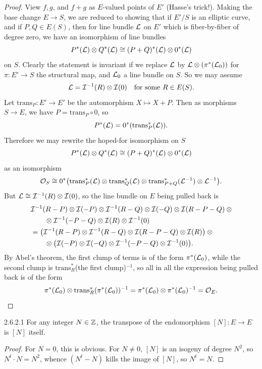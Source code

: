 \begin{proof}
View $f, g$, and $f + g$ as $E$-valued points of $E'$ (Hasse's trick!). Making the base change $E \to S$, we are reduced to showing that if $E'/S$ is an elliptic curve, and if $P, Q \in E(S)$, then for line bundle $\mathcal{L}$ on $E'$ which is fiber-by-fiber of degree zero, we have an isomorphism of line bundles
\[
P^*(\mathcal{L}) \otimes Q^*(\mathcal{L}) \cong (P + Q)^*(\mathcal{L}) \otimes 0^*(\mathcal{L})
\]
on $S$. Clearly the statement is invariant if we replace $\mathcal{L}$ by $\mathcal{L} \otimes (\pi^*(\mathcal{L}_0))$ for $\pi : E' \to S$ the structural map, and $\mathcal{L}_0$ a line bundle on $S$. So we may assume
\[
\mathcal{L} = \mathcal{I}^{-1}(R) \otimes \mathcal{I}(0) \quad \text{for some } R \in E(S).
\]
Let $\mathrm{trans}_P : E' \to E'$ be the automorphism $X \mapsto X + P$. Then as morphisms $S \to E$, we have $P = \mathrm{trans}_P \circ 0$, so
\[
P^*(\mathcal{L}) = 0^*(\mathrm{trans}_P^*(\mathcal{L})).
\]
Therefore we may rewrite the hoped-for isomorphism on $S$
\[
P^*(\mathcal{L}) \otimes Q^*(\mathcal{L}) \cong (P + Q)^*(\mathcal{L}) \otimes 0^*(\mathcal{L})
\]
as an isomorphism
\[
\mathcal{O}_S \cong 0^*\bigl(\mathrm{trans}_P^*(\mathcal{L}) \otimes \mathrm{trans}_Q^*(\mathcal{L}) \otimes \mathrm{trans}_{P+Q}^*(\mathcal{L}^{-1}) \otimes \mathcal{L}^{-1}\bigr).
\]
But $\mathcal{L} \cong \mathcal{I}^{-1}(R) \otimes \mathcal{I}(0)$, so the line bundle on $E$ being pulled back is
\[
\begin{aligned}
&\mathcal{I}^{-1}(R-P) \otimes \mathcal{I}(-P) \otimes \mathcal{I}^{-1}(R-Q) \otimes \mathcal{I}(-Q) \otimes \mathcal{I}(R-P-Q) \otimes {}\mkern-4mu \\
&\qquad \otimes \mathcal{I}^{-1}(-P-Q) \otimes \mathcal{I}(R) \otimes \mathcal{I}^{-1}(0) \\
&= \bigl(\mathcal{I}^{-1}(R-P) \otimes \mathcal{I}^{-1}(R-Q) \otimes \mathcal{I}(R-P-Q) \otimes \mathcal{I}(R)\bigr) \otimes {} \\
&\qquad \otimes \bigl(\mathcal{I}(-P) \otimes \mathcal{I}(-Q) \otimes \mathcal{I}^{-1}(-P-Q) \otimes \mathcal{I}^{-1}(0)\bigr).
\end{aligned}
\]
By Abel's theorem, the first clump of terms is of the form $\pi^*(\mathcal{L}_0)$, while the second clump is $\mathrm{trans}_R^*$(the first clump)$^{-1}$, so all in all the expression being pulled back is of the form
\[
\pi^*(\mathcal{L}_0) \otimes \mathrm{trans}_R^*(\pi^*(\mathcal{L}_0))^{-1} = \pi^*(\mathcal{L}_0) \otimes \pi^*(\mathcal{L}_0)^{-1} = \mathcal{O}_E.
\]
\end{proof}

\begin{customcor}{2.6.2.1}\label{cor:2.6.2.1}
For any integer $N \in \mathbb{Z}$, the transpose of the endomorphism $[N] : E \to E$ is $[N]$ itself.
\end{customcor}

\begin{proof}
For $N = 0$, this is obvious. For $N \ne 0$, $[N]$ is an isogeny of degree $N^2$, so $N^t \cdot N = N^2$, whence $(N^t - N)$ kills the image of $[N]$, so $N^t = N$.
\end{proof}

